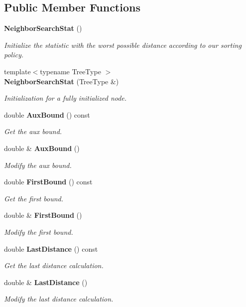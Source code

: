 \subsection*{Public Member Functions}
\begin{DoxyCompactItemize}
\item 
\textbf{ Neighbor\+Search\+Stat} ()
\begin{DoxyCompactList}\small\item\em Initialize the statistic with the worst possible distance according to our sorting policy. \end{DoxyCompactList}\item 
{\footnotesize template$<$typename Tree\+Type $>$ }\\\textbf{ Neighbor\+Search\+Stat} (Tree\+Type \&)
\begin{DoxyCompactList}\small\item\em Initialization for a fully initialized node. \end{DoxyCompactList}\item 
double \textbf{ Aux\+Bound} () const
\begin{DoxyCompactList}\small\item\em Get the aux bound. \end{DoxyCompactList}\item 
double \& \textbf{ Aux\+Bound} ()
\begin{DoxyCompactList}\small\item\em Modify the aux bound. \end{DoxyCompactList}\item 
double \textbf{ First\+Bound} () const
\begin{DoxyCompactList}\small\item\em Get the first bound. \end{DoxyCompactList}\item 
double \& \textbf{ First\+Bound} ()
\begin{DoxyCompactList}\small\item\em Modify the first bound. \end{DoxyCompactList}\item 
double \textbf{ Last\+Distance} () const
\begin{DoxyCompactList}\small\item\em Get the last distance calculation. \end{DoxyCompactList}\item 
double \& \textbf{ Last\+Distance} ()
\begin{DoxyCompactList}\small\item\em Modify the last distance calculation. \end{DoxyCompactList}\item 

\end{DoxyCompactItemize}
